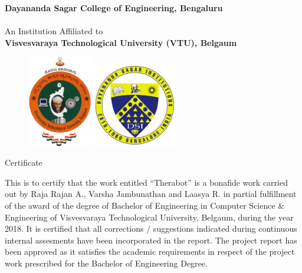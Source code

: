 \thispagestyle{empty}

\setlength{\toptafiddle}{1in}
\setlength{\bottafiddle}{1in}

\vspace*{-0.75in}
\enlargethispage{\toptafiddle}

\begin{center}
\textbf{Dayananda Sagar College of Engineering, Bengaluru}\\
\hspace{0.1cm}\\
An Institution Affiliated to\\
\textbf{Visvesvaraya Technological University (VTU), Belgaum}\\
\vspace{0.2cm}

\begin{figure}[h]
    \centering
    \includegraphics[height=4cm]{images/vtu.png}
    \hspace{0.1\textwidth}
    \includegraphics[height=3.7cm]{images/dsi.png}
\end{figure}

\Huge{Certificate}
\end{center}

This is to certify that the work entitled ``Therabot'' is a bonafide work carried out by Raja Rajan A., Varsha Jambunathan and Laasya R. in partial fulfillment of the award of the degree of Bachelor of Engineering in Computer Science \& Engineering of Visvesvaraya Technological University, Belgaum, during the year 2018. It is certified that all corrections / suggestions indicated during continuous internal assesments have been incorporated in the report. The project report has been approved as it satisfies the academic requirements in respect of the project work prescribed for the Bachelor of Engineering Degree.

